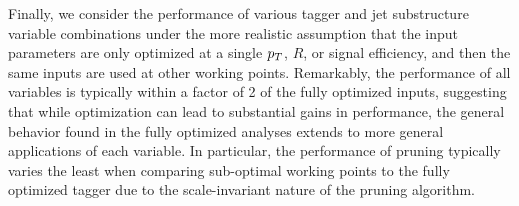 Finally, we consider the performance of various tagger and jet substructure variable combinations under the more realistic assumption that the input parameters are only optimized at a single $p_T$, $R$, or signal efficiency, and then the same inputs are used at other working points. Remarkably, the performance of all variables is typically within a factor of 2 of the fully optimized inputs, suggesting that while optimization can lead to substantial gains in performance, the general behavior found in the fully optimized analyses extends to more general applications of each variable. In particular, the performance of pruning typically varies the least when comparing sub-optimal working points to the fully optimized tagger due to the scale-invariant nature of the pruning algorithm.
